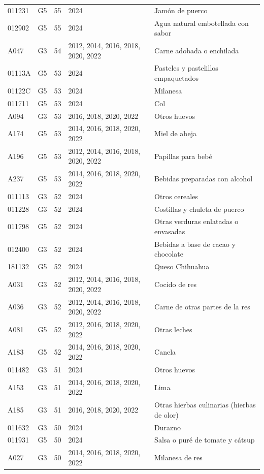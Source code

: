 \begin{table}[ht]
\begin{tabular}{llrll}
  011231 & G5 &  55 & 2024 & Jamón de puerco \\ 
  012902 & G5 &  55 & 2024 & Agua natural embotellada con sabor \\ 
  A047 & G3 &  54 & 2012, 2014, 2016, 2018, 2020, 2022 & Carne adobada o enchilada \\ 
  01113A & G5 &  53 & 2024 & Pasteles y pastelillos empaquetados \\ 
  01122C & G5 &  53 & 2024 & Milanesa \\ 
  011711 & G5 &  53 & 2024 & Col \\ 
  A094 & G3 &  53 & 2016, 2018, 2020, 2022 & Otros huevos \\ 
  A174 & G5 &  53 & 2014, 2016, 2018, 2020, 2022 & Miel de abeja \\ 
  A196 & G5 &  53 & 2012, 2014, 2016, 2018, 2020, 2022 & Papillas para bebé \\ 
  A237 & G5 &  53 & 2014, 2016, 2018, 2020, 2022 & Bebidas preparadas con alcohol \\ 
  011113 & G3 &  52 & 2024 & Otros cereales \\ 
  011228 & G3 &  52 & 2024 & Costillas y chuleta de puerco \\ 
  011798 & G5 &  52 & 2024 & Otras verduras enlatadas o envasadas \\ 
  012400 & G3 &  52 & 2024 & Bebidas a base de cacao y chocolate \\ 
  181132 & G5 &  52 & 2024 & Queso Chihuahua \\ 
  A031 & G3 &  52 & 2012, 2014, 2016, 2018, 2020, 2022 & Cocido de res \\ 
  A036 & G3 &  52 & 2012, 2014, 2016, 2018, 2020, 2022 & Carne de otras partes de la res \\ 
  A081 & G5 &  52 & 2012, 2016, 2018, 2020, 2022 & Otras leches \\ 
  A183 & G5 &  52 & 2014, 2016, 2018, 2020, 2022 & Canela \\ 
  011482 & G3 &  51 & 2024 & Otros huevos \\ 
  A153 & G3 &  51 & 2014, 2016, 2018, 2020, 2022 & Lima \\ 
  A185 & G3 &  51 & 2016, 2018, 2020, 2022 & Otras hierbas culinarias (hierbas de olor) \\ 
  011632 & G3 &  50 & 2024 & Durazno \\ 
  011931 & G5 &  50 & 2024 & Salsa o puré de tomate y cátsup \\ 
  A027 & G3 &  50 & 2014, 2016, 2018, 2020, 2022 & Milanesa de res \\ 

\end{tabular}
\end{table}
